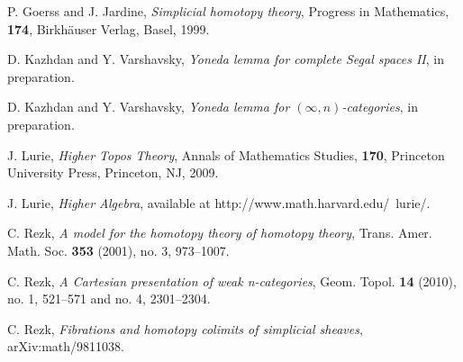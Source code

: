 \documentclass[12pt]{amsart}
\theoremstyle{plain}
\theoremstyle{definition}
\numberwithin{equation}{section}
\begin{document}
\begin{thebibliography}{99}
P. Goerss and J. Jardine, {\em Simplicial homotopy theory},
Progress in Mathematics, {\bf 174}, Birkh\"auser Verlag, Basel,
1999.

D. Kazhdan and Y. Varshavsky, {\em Yoneda lemma for complete Segal
spaces II}, in preparation.

D. Kazhdan and Y. Varshavsky, {\em Yoneda lemma for
$(\infty,n)$-categories}, in preparation.

J. Lurie, {\em Higher Topos Theory}, Annals of Mathematics
Studies, {\bf 170}, Princeton University Press, Princeton, NJ,
2009.

J. Lurie, {\em Higher Algebra}, available at
http://www.math.harvard.edu/~lurie/.

C. Rezk, {\em A model for the homotopy theory of homotopy theory},
Trans. Amer. Math. Soc. {\bf 353} (2001), no. 3, 973--1007.

C. Rezk, {\em A Cartesian presentation of weak n-categories},
Geom. Topol. {\bf 14} (2010), no. 1, 521--571 and no. 4,
2301--2304.

C. Rezk, {\em Fibrations and homotopy colimits of simplicial
sheaves}, arXiv:math/9811038.














\end{thebibliography}
\end{document}
